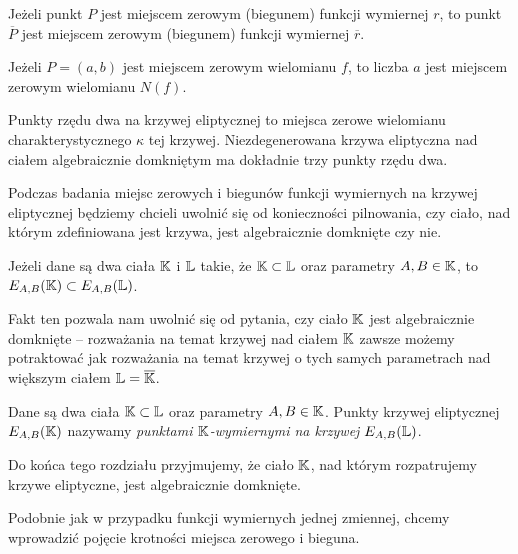 \begin{fact}
Jeżeli punkt $P$
jest miejscem zerowym (biegunem) funkcji wymiernej $r$,
to punkt $\overline{P}$
jest miejscem zerowym (biegunem) funkcji wymiernej $\overline{r}$.
\end{fact}

\begin{fact}\label{zero_of_norm_fact}
Jeżeli $P = (a, b)$ jest miejscem zerowym wielomianu $f$,
to liczba $a$ jest miejscem zerowym wielomianu $N(f)$.
\end{fact}

\begin{fact}
Punkty rzędu dwa na krzywej eliptycznej
to miejsca zerowe wielomianu charakterystycznego $\kappa$ tej krzywej.
Niezdegenerowana krzywa eliptyczna nad ciałem algebraicznie domkniętym
ma dokładnie trzy punkty rzędu dwa.
\end{fact}

Podczas badania miejsc zerowych i biegunów
funkcji wymiernych na krzywej eliptycznej
będziemy chcieli uwolnić się od konieczności pilnowania,
czy ciało, nad którym zdefiniowana jest krzywa,
jest algebraicznie domknięte czy nie.

\begin{fact}
Jeżeli dane są dwa ciała $\mathbb{K}$ i $\mathbb{L}$ takie, że $\mathbb{K} \subset \mathbb{L}$
oraz parametry $A,B \in \mathbb{K}$,
to $E_{A,B}(\mathbb{K}) \subset E_{A,B}(\mathbb{L})$.
\end{fact}

Fakt ten pozwala nam uwolnić się od pytania,
czy ciało $\mathbb{K}$ jest algebraicznie domknięte --
rozważania na temat krzywej nad ciałem $\mathbb{K}$
zawsze możemy potraktować
jak rozważania na temat krzywej o tych samych parametrach
nad większym ciałem $\mathbb{L} = \overline{\mathbb{K}}$.

\begin{definition}
Dane są dwa ciała $\mathbb{K} \subset \mathbb{L}$ oraz parametry $A, B \in \mathbb{K}$.
Punkty krzywej eliptycznej $E_{A,B}(\mathbb{K})$
nazywamy \emph{punktami $\mathbb{K}$-wymiernymi na krzywej $E_{A,B}(\mathbb{L})$}.
\end{definition}

\begin{remark}
Do końca tego rozdziału przyjmujemy,
że ciało $\mathbb{K}$, nad którym rozpatrujemy krzywe eliptyczne,
jest algebraicznie domknięte.
\end{remark}

Podobnie jak w przypadku funkcji wymiernych jednej zmiennej,
chcemy wprowadzić pojęcie krotności miejsca zerowego i bieguna.

